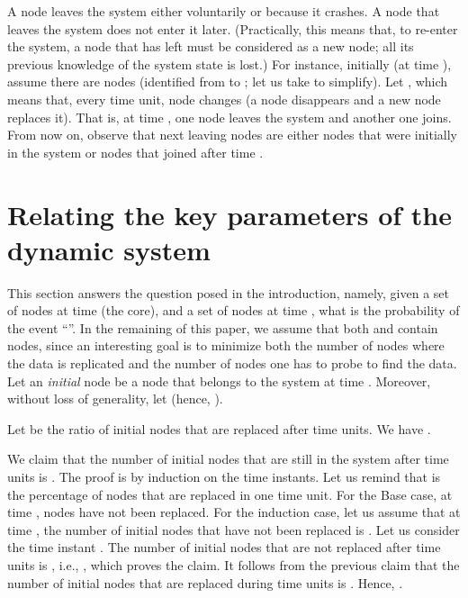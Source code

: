 \documentclass[]{llncs}
\newcommand{\toto}{xxx}
\newenvironment{proofL}{\noindent{\bf
Proof }} {\hspace*{\fill}\par\vspace{3mm}}
\begin{document}
A node leaves the system either voluntarily or because it crashes.  
A node that leaves the system  does not enter it later.  (Practically, 
this means that, to re-enter the system, a node that has left 
must be considered as a new node; all its previous knowledge of the system 
state is lost.) 
For instance, initially (at time ), assume 
there  are  nodes  (identified  from   to
; let us take  to  simplify).  Let , which means that, 
every time unit,    node changes (a node disappears and a new 
node replaces it).  
That is, at time , one node leaves the system and another one
joins.  From now on, observe that next leaving nodes are either
nodes that were initially in the system or nodes that joined
after time .





\section{Relating the key parameters of the dynamic system}
\label{sec:analysis}

This   section answers the  question posed  in the  introduction, namely,
given a  set  of nodes  at time   (the core), 
and  a set   of  nodes at   time  , what
is the  probability  of the event ``''. 
In the remaining of this paper, we assume that both  and  
contain  nodes, since an interesting goal is to minimize both the 
number of nodes where the data is replicated and the number of nodes one has 
to probe to find the data.
Let an  {\it initial} node  be a  node that belongs  to the system  at time
.  Moreover,  without  loss   of  generality,  let    (hence,
). 

\begin{lemma}
\label{lemme-valeur-de-C}
Let  be the ratio of initial nodes that are replaced after
 time units. We have . 
\end{lemma}

\begin{proofL}
We claim that the number of initial nodes that are still in the system
after  time units is . 
The proof is by  induction on the time instants. Let us  remind that  is
the percentage of nodes that are replaced in one time unit. 
For the Base case, at  time ,    nodes have  not been
replaced. 
For the induction case, let us assume  that at time , the number of
initial nodes  that have  not been replaced is . 
Let us  consider the  time instant  .  
The number of initial nodes that are not replaced after  time units
is  , i.e.,  ,
which proves the claim. 
It follows from the previous claim that the number of initial nodes that are 
replaced during  time  units is . 
Hence, . 
\renewcommand{\toto}{lemme-valeur-de-C}
\end{proofL}
\end{document}

